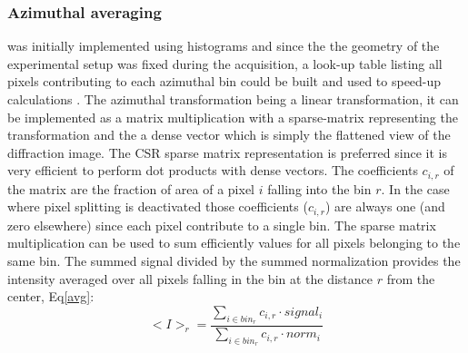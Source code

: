 \documentclass[preprint]{iucr}              %
\begin{document}
\subsubsection{Azimuthal averaging} was initially implemented using histograms and since the the geometry of the experimental setup was fixed during the acquisition, a look-up table listing all pixels contributing to each  azimuthal bin could be built and used to speed-up calculations \cite{pyFAI_gpu}.
The azimuthal transformation being a linear transformation, it can be implemented as a  matrix multiplication with a sparse-matrix representing the transformation and the a dense vector which is simply the flattened view of the diffraction image. 
The CSR sparse matrix representation is preferred since it is very efficient to perform dot products with dense vectors.
The coefficients $c_{i,r}$ of the matrix are the fraction of area of a pixel $i$ falling into the bin $r$.
In the case where pixel splitting is deactivated those coefficients  ($c_{i,r}$) are always one (and zero elsewhere) since each pixel contribute to a single bin.
The sparse matrix multiplication can be used to sum efficiently values for all pixels belonging to the same bin.
The summed signal divided by the summed normalization provides the intensity averaged over all pixels falling in the bin at the distance $r$ from the center, Eq\ref{avg}: 
\begin{equation}
\label{avg}
<I>_{r} = \frac{\sum\limits_{i \in bin_r} c_{i,r} \cdot signal_i}
                        {\sum\limits_{i \in bin_r} c_{i,r} \cdot norm_i} 
\end{equation}  
\end{document}
